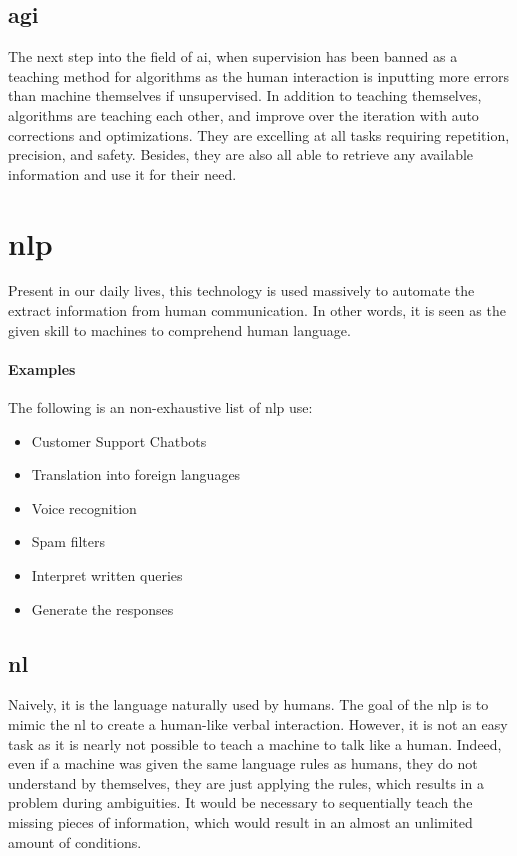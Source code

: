 \subsection{\gls{agi}}
The next step into the field of \gls{ai}, when supervision has been banned as a teaching method for algorithms as the human interaction is inputting more errors than machine themselves if unsupervised. In addition to teaching themselves, algorithms are teaching each other, and improve over the iteration with auto corrections and optimizations. They are excelling at all tasks requiring repetition, precision, and safety. Besides, they are also all able to retrieve any available information and use it for their need. 


\section{\gls{nlp}}
Present in our daily lives, this technology is used massively to automate the extract information from human communication. In other words, it is seen as the given skill to machines to comprehend human language.

\paragraph{Examples}
The following is an non-exhaustive list of \gls{nlp} use:
\begin{itemize}
    \setlength\itemsep{0em}
    \item Customer Support Chatbots
    \item Translation into foreign languages
    \item Voice recognition
    \item Spam filters
    \item Interpret written queries
    \item Generate the responses
\end{itemize}

\subsection{\gls{nl}}
Naively, it is the language naturally used by humans. The goal of the \gls{nlp} is to mimic the \gls{nl} to create a human-like verbal interaction. However, it is not an easy task as it is nearly not possible to teach a machine to talk like a human. Indeed, even if a machine was given the same language rules as humans, they do not understand by themselves, they are just applying the rules, which results in a problem during ambiguities. It would be necessary to sequentially teach the missing pieces of information, which would result in an almost an unlimited amount of conditions.

